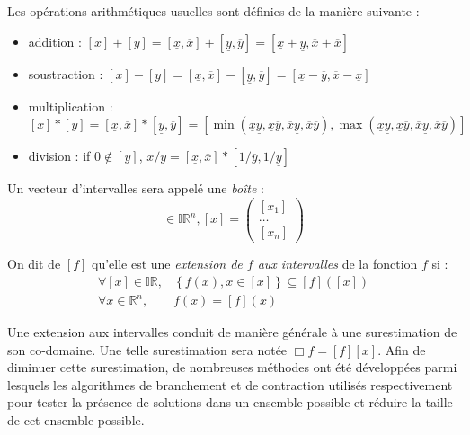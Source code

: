 Les op\'erations arithm\'etiques usuelles sont d\'efinies de la mani\`ere 
suivante :
\begin{itemize}
 \item addition : $[x]+[y] = [\underline{x},\overline{x}] + 
[\underline{y},\overline{y}] = [\underline{x} + 
\underline{y},\overline{x}+\overline{x}]$
\item soustraction : $[x]-[y] = [\underline{x},\overline{x}] - 
[\underline{y},\overline{y}] 
= [\underline{x} - \overline{y},\overline{x}-\underline{x}]$
\item multiplication : $[x]*[y] = [\underline{x},\overline{x}] * 
[\underline{y},\overline{y}] 
= [\min(\underline{x}\underline{y}, 
\underline{x}\overline{y},\overline{x}\underline{y},\overline{x}\overline{y}),
\max(\underline{x}\underline{y}, 
\underline{x}\overline{y},\overline{x}\underline{y},\overline{x}\overline{y})]$
\item division : if $0 \notin [y]$, $x/y = [\underline{x}, 
\overline{x}]*[1/\overline{y},1/\underline{y}]$ 
\end{itemize}

Un vecteur d'intervalles sera appel\'e une {\it bo\^ite} :
\begin{equation}
[x] \in \mathbb I \mathbb R^n, [x] = \begin{pmatrix}
                                      [x_1]\\
				      \dots \\
				      [x_n]
                                     \end{pmatrix}
\label{chap01:eq12}
\end{equation}

On dit de $[f]$ qu'elle est une {\it extension de $f$ aux intervalles} 
de la fonction $f$ si :
\begin{equation}
\begin{array}{ll}
\forall [x] \in \mathbb I \mathbb R, & \left \lbrace f(x), x \in [x] \right 
\rbrace \subseteq [f]([x]) \\
\forall x \in \mathbb R^n, & f(x) = [f](x) 
\end{array}
\label{chap01:eq13}
\end{equation}

Une extension aux intervalles conduit de mani\`ere g\'en\'erale \`a une 
surestimation de son co-domaine. Une telle surestimation sera not\'ee $\Box f = 
[f][x]$. Afin de diminuer cette surestimation, de nombreuses m\'ethodes ont 
\'et\'e d\'evelopp\'ees parmi lesquels les algorithmes de branchement et de 
contraction utilis\'es respectivement pour tester la pr\'esence de solutions 
dans un ensemble possible et r\'eduire la taille de cet ensemble possible.

